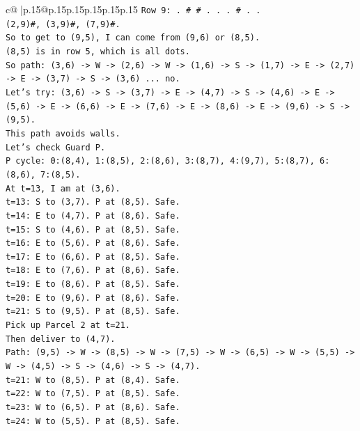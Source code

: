 \documentclass{article}
\begin{document}
{\begin{supertabular}{c@{$\;$}|p{.15\linewidth}@{}p{.15\linewidth}p{.15\linewidth}p{.15\linewidth}p{.15\linewidth}p{.15\linewidth}}
{{{\texttt{Row 9: . \# \# . . . \# . .} \\
\texttt{(2,9)\#, (3,9)\#, (7,9)\#.} \\
\texttt{So to get to (9,5), I can come from (9,6) or (8,5).} \\
\texttt{(8,5) is in row 5, which is all dots.} \\
\texttt{So path: (3,6) {-}> W {-}> (2,6) {-}> W {-}> (1,6) {-}> S {-}> (1,7) {-}> E {-}> (2,7) {-}> E {-}> (3,7) {-}> S {-}> (3,6) ... no.} \\
\texttt{Let's try: (3,6) {-}> S {-}> (3,7) {-}> E {-}> (4,7) {-}> S {-}> (4,6) {-}> E {-}> (5,6) {-}> E {-}> (6,6) {-}> E {-}> (7,6) {-}> E {-}> (8,6) {-}> E {-}> (9,6) {-}> S {-}> (9,5).} \\
\texttt{This path avoids walls.} \\
\texttt{Let's check Guard P.} \\
\texttt{P cycle: 0:(8,4), 1:(8,5), 2:(8,6), 3:(8,7), 4:(9,7), 5:(8,7), 6:(8,6), 7:(8,5).} \\
\texttt{At t=13, I am at (3,6).} \\
\texttt{t=13: S to (3,7). P at (8,5). Safe.} \\
\texttt{t=14: E to (4,7). P at (8,6). Safe.} \\
\texttt{t=15: S to (4,6). P at (8,5). Safe.} \\
\texttt{t=16: E to (5,6). P at (8,6). Safe.} \\
\texttt{t=17: E to (6,6). P at (8,5). Safe.} \\
\texttt{t=18: E to (7,6). P at (8,6). Safe.} \\
\texttt{t=19: E to (8,6). P at (8,5). Safe.} \\
\texttt{t=20: E to (9,6). P at (8,6). Safe.} \\
\texttt{t=21: S to (9,5). P at (8,5). Safe.} \\
\texttt{Pick up Parcel 2 at t=21.} \\
\texttt{Then deliver to (4,7).} \\
\texttt{Path: (9,5) {-}> W {-}> (8,5) {-}> W {-}> (7,5) {-}> W {-}> (6,5) {-}> W {-}> (5,5) {-}> W {-}> (4,5) {-}> S {-}> (4,6) {-}> S {-}> (4,7).} \\
\texttt{t=21: W to (8,5). P at (8,4). Safe.} \\
\texttt{t=22: W to (7,5). P at (8,5). Safe.} \\
\texttt{t=23: W to (6,5). P at (8,6). Safe.} \\
\texttt{t=24: W to (5,5). P at (8,5). Safe.} \\
}}}
\end{supertabular}}
\end{document}

